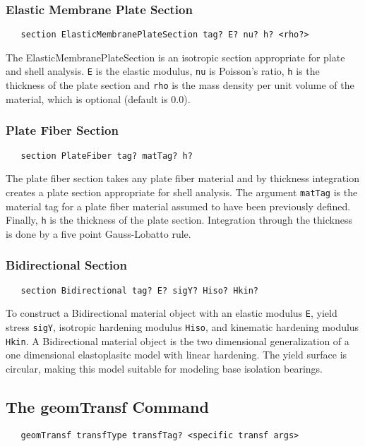 \documentclass[12pt]{article}
\begin{document}
\subsubsection{Elastic Membrane Plate Section}
{\sf\small
\begin{verbatim}
   section ElasticMembranePlateSection tag? E? nu? h? <rho?>
\end{verbatim}
}
The ElasticMembranePlateSection
is an isotropic section appropriate for plate and shell analysis.
{\tt E} is the elastic modulus, {\tt nu} is Poisson's ratio, 
{\tt h} is the thickness of the plate section and
{\tt rho} is the mass density per unit \p volume of the material,
which is optional (default is 0.0).


\subsubsection{Plate Fiber Section}
{\sf\small
\begin{verbatim}
   section PlateFiber tag? matTag? h?
\end{verbatim}
}
The plate fiber section takes any plate fiber material and by 
thickness integration creates a plate section appropriate for shell analysis.
The argument {\tt matTag} is the material tag for a plate
fiber material assumed to have been previously defined. Finally,
{\tt h} is the thickness of the plate section. Integration through the
thickness is done by a five point Gauss-Lobatto rule.

\subsubsection{Bidirectional Section}
{\sf\small
\begin{verbatim}
   section Bidirectional tag? E? sigY? Hiso? Hkin?
\end{verbatim}
}

To construct a Bidirectional material object with an elastic modulus
{\tt E}, yield stress {\tt sigY}, isotropic hardening modulus {\tt Hiso},
and kinematic hardening modulus {\tt Hkin}. A Bidirectional material
object is the two dimensional generalization of a one dimensional
elastoplasitc model with linear hardening. The yield surface is circular,
making this model suitable for modeling base isolation bearings.

\subsection{The geomTransf Command}
{\sf\small
\begin{verbatim}
   geomTransf transfType transfTag? <specific transf args>
\end{verbatim}
}
\end{document}
